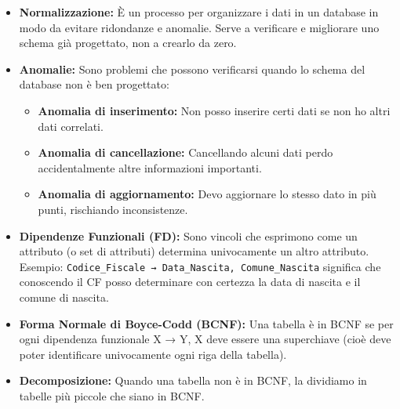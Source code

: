 \begin{itemize}
	\item \textbf{Normalizzazione:} È un processo per organizzare i dati in un database in modo da evitare ridondanze e anomalie. Serve a verificare e migliorare uno schema già progettato, non a crearlo da zero.
	
	\item \textbf{Anomalie:} Sono problemi che possono verificarsi quando lo schema del database non è ben progettato:
	\begin{itemize}
		\item \textbf{Anomalia di inserimento:} Non posso inserire certi dati se non ho altri dati correlati.
		\item \textbf{Anomalia di cancellazione:} Cancellando alcuni dati perdo accidentalmente altre informazioni importanti.
		\item \textbf{Anomalia di aggiornamento:} Devo aggiornare lo stesso dato in più punti, rischiando inconsistenze.
	\end{itemize}
	
	\item \textbf{Dipendenze Funzionali (FD):} Sono vincoli che esprimono come un attributo (o set di attributi) determina univocamente un altro attributo. Esempio: \texttt{Codice\_Fiscale → Data\_Nascita, Comune\_Nascita} significa che conoscendo il CF posso determinare con certezza la data di nascita e il comune di nascita.
	
	\item \textbf{Forma Normale di Boyce-Codd (BCNF):} Una tabella è in BCNF se per ogni dipendenza funzionale X → Y, X deve essere una superchiave (cioè deve poter identificare univocamente ogni riga della tabella).
	
	\item \textbf{Decomposizione:} Quando una tabella non è in BCNF, la dividiamo in tabelle più piccole che siano in BCNF.
	

\end{itemize}

